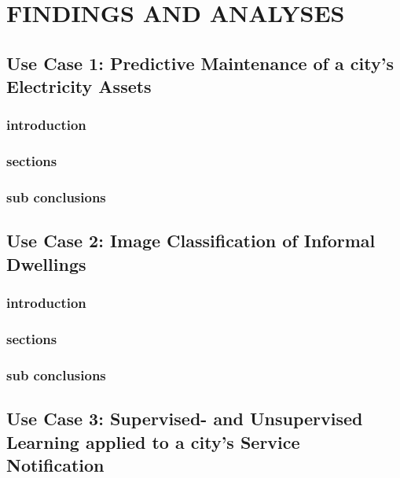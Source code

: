 \documentclass[]{book}
\theoremstyle{definition}
\theoremstyle{definition}
\theoremstyle{definition}
\theoremstyle{remark}
\begin{document}
\chapter{FINDINGS AND ANALYSES}\label{findings-and-analyses}

\section{Use Case 1: Predictive Maintenance of a city's Electricity
Assets}\label{use-case-1-predictive-maintenance-of-a-citys-electricity-assets}

\subsection{introduction}\label{introduction-3}

\subsection{sections}\label{sections}

\subsection{sub conclusions}\label{sub-conclusions}

\section{Use Case 2: Image Classification of Informal
Dwellings}\label{use-case-2-image-classification-of-informal-dwellings}

\subsection{introduction}\label{introduction-4}

\subsection{sections}\label{sections-1}

\subsection{sub conclusions}\label{sub-conclusions-1}

\section{Use Case 3: Supervised- and Unsupervised Learning applied to a
city's Service
Notification}\label{use-case-3-supervised--and-unsupervised-learning-applied-to-a-citys-service-notification}
\end{document}
